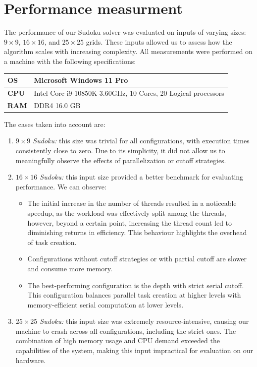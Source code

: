 \documentclass[paper=a4, fontsize=12pt]{scrartcl}
\numberwithin{equation}{section}
\numberwithin{figure}{section}
\numberwithin{table}{section}
\begin{document}
    \section{Performance measurment}
    The performance of our Sudoku solver was evaluated on inputs of varying sizes: $9\times 9$, $16\times 16$, and $25\times 25$ grids. 
    These inputs allowed us to assess how the algorithm scales with increasing complexity.
    All measurements were performed on a machine with the following specifications: 
    \begin{table}[!ht]
        \centering
        \begin{tabular}{|l|l|}
        \hline
        \textbf{OS}  & Microsoft Windows 11 Pro                                                   \\ \hline
        \textbf{CPU} & Intel Core i9-10850K 3.60GHz, 10 Cores, 20 Logical processors \\ \hline
        \textbf{RAM} & DDR4 16.0 GB                                                               \\ \hline
        \end{tabular}
    \end{table}
    The cases taken into account are:
    \begin{enumerate}
        \item \textit{$9\times 9$ Sudoku:} this size was trivial for all configurations, with execution times consistently close to zero. 
            Due to its simplicity, it did not allow us to meaningfully observe the effects of parallelization or cutoff strategies.
        \item \textit{$16\times 16$ Sudoku:} this input size provided a better benchmark for evaluating performance. We can observe: 
            \begin{itemize}
                \item The initial increase in the number of threads resulted in a noticeable speedup, as the workload was effectively split among the threads, however, beyond a certain point, increasing the thread count led to diminishing returns in efficiency. 
                    This behaviour highlights the overhead of task creation.
                \item Configurations without cutoff strategies or with partial cutoff are slower and consume more memory.
                \item The best-performing configuration is the depth with strict serial cutoff. 
                    This configuration balances parallel task creation at higher levels with memory-efficient serial computation at lower levels.
            \end{itemize}
        \item \textit{$25\times 25$ Sudoku:} this input size was extremely resource-intensive, causing our machine to crash across all configurations, including the strict ones. 
            The combination of high memory usage and CPU demand exceeded the capabilities of the system, making this input impractical for evaluation on our hardware.
    \end{enumerate}
\end{document}
